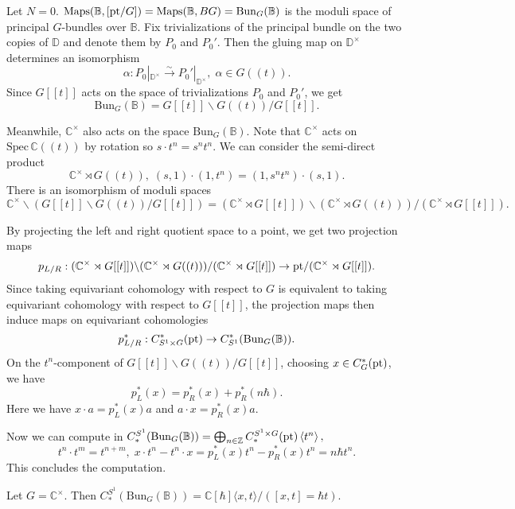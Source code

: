 \begin{Example}
    Let $N = 0$. $\mathrm{Maps}(\mathbb{B}, [\mathrm{pt}/G]) = \mathrm{Maps}(\mathbb{B}, BG) = \mathrm{Bun}_G(\mathbb{B})$ is the moduli space of principal $G$-bundles over $\mathbb{B}$. Fix trivializations of the principal bundle on the two copies of $\mathbb{D}$ and denote them by $P_0$ and $P_0'$. Then the gluing map on $\mathbb{D}^\times$ determines an isomorphism
    $$\alpha: P_0|_{\mathbb{D}^\times} \xrightarrow{\sim} P_0'|_{\mathbb{D}^\times}, \; \alpha \in G((t)).$$
    Since $G[[t]]$ acts on the space of trivializations $P_0$ and $P_0'$, we get
    $$\mathrm{Bun}_G(\mathbb{B}) = G[[t]] \backslash G((t)) / G[[t]].$$

    Meanwhile, $\mathbb{C}^\times$ also acts on the space $\mathrm{Bun}_G(\mathbb{B})$. Note that $\mathbb{C}^\times$ acts on $\mathrm{Spec}\, \mathbb{C}((t))$ by rotation so $s \cdot t^n = s^nt^n$. We can consider the semi-direct product 
    $$\mathbb{C}^\times \rtimes G((t)), \; (s, 1) \cdot (1, t^n) = (1, s^nt^n) \cdot (s, 1).$$
    There is an isomorphism of moduli spaces
    $$\mathbb{C}^\times \backslash (G[[t]] \backslash G((t)) / G[[t]]) = (\mathbb{C}^\times \rtimes G[[t]]) \backslash (\mathbb{C}^\times \rtimes G((t))) / (\mathbb{C}^\times \rtimes G[[t]]).$$
    
    By projecting the left and right quotient space to a point, we get two projection maps
    $$p_{L/R}: (\mathbb{C}^\times \rtimes G[[t]]) \backslash (\mathbb{C}^\times \rtimes G((t))) / (\mathbb{C}^\times \rtimes G[[t]]) \rightarrow \mathrm{pt} /  (\mathbb{C}^\times \rtimes G[[t]]).$$
    Since taking equivariant cohomology with respect to $G$ is equivalent to taking equivariant cohomology with respect to $G[[t]]$, the projection maps then induce maps on equivariant cohomologies
    $$p_{L/R}^*: C^*_{S^1 \times G}(\mathrm{pt}) \rightarrow C^*_{S^1}(\mathrm{Bun}_G(\mathbb{B})).$$
    On the $t^n$-component of $G[[t]] \backslash G((t)) / G[[t]]$, choosing $x \in C^*_{G}(\mathrm{pt})$, we have
    $$p_L^*(x) = p_R^*(x) + p_R^*(n \hbar).$$
    Here we have $x \cdot a = p_L^*(x) a$ and $a \cdot x = p_R^*(x) a$.

    Now we can compute in $C_*^{S^1}(\mathrm{Bun}_G(\mathbb{B})) = \bigoplus_{n \in \mathbb{Z}} C_*^{S^1 \times G}(\mathrm{pt}) \left< t^n \right>,$
    $$t^n \cdot t^m = t^{n+m}, \; x \cdot t^n - t^n \cdot x = p_L^*(x) t^n - p_R^*(x) t^n = n \hbar t^n.$$
    This concludes the computation.
\end{Example}

\begin{Proposition}
    Let $G = \mathbb{C}^\times$. Then $C_*^{S^1}(\mathrm{Bun}_G(\mathbb{B})) = \mathbb{C}[\hbar]\langle x, t \rangle/([x, t] = \hbar t)$.
\end{Proposition}


